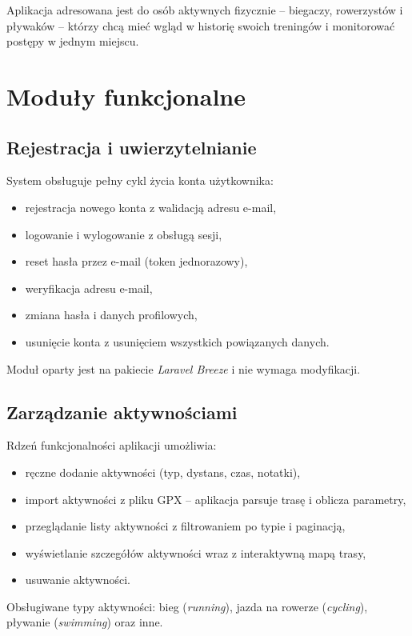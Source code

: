 \documentclass[12pt,a4paper]{report}
\begin{document}
Aplikacja adresowana jest do osób aktywnych fizycznie -- biegaczy, rowerzystów i pływaków -- którzy chcą mieć wgląd w historię swoich treningów i monitorować postępy w jednym miejscu.

\section{Moduły funkcjonalne}

\subsection{Rejestracja i uwierzytelnianie}

System obsługuje pełny cykl życia konta użytkownika:
\begin{itemize}[noitemsep]
    \item rejestracja nowego konta z walidacją adresu e-mail,
    \item logowanie i wylogowanie z obsługą sesji,
    \item reset hasła przez e-mail (token jednorazowy),
    \item weryfikacja adresu e-mail,
    \item zmiana hasła i danych profilowych,
    \item usunięcie konta z usunięciem wszystkich powiązanych danych.
\end{itemize}

Moduł oparty jest na pakiecie \textit{Laravel Breeze} i nie wymaga modyfikacji.

\subsection{Zarządzanie aktywnościami}

Rdzeń funkcjonalności aplikacji umożliwia:
\begin{itemize}[noitemsep]
    \item ręczne dodanie aktywności (typ, dystans, czas, notatki),
    \item import aktywności z pliku GPX -- aplikacja parsuje trasę i oblicza parametry,
    \item przeglądanie listy aktywności z filtrowaniem po typie i paginacją,
    \item wyświetlanie szczegółów aktywności wraz z interaktywną mapą trasy,
    \item usuwanie aktywności.
\end{itemize}

Obsługiwane typy aktywności: bieg (\textit{running}), jazda na rowerze (\textit{cycling}), pływanie (\textit{swimming}) oraz inne.
\end{document}

